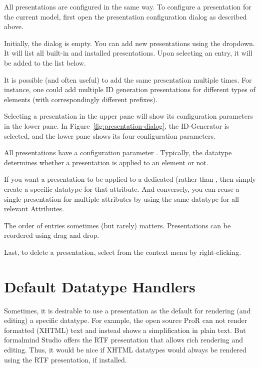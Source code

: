 All presentations are configured in the same way.  To configure a presentation for the current model, first open the presentation configuration dialog as described above.

Initially, the dialog is empty.  You can add new presentations using the  dropdown.  It will list all built-in and installed presentations.  Upon selecting an entry, it will be added to the list below.

\begin{info}It is possible (and often useful) to add the same presentation multiple times. For instance, one could add multiple ID generation presentations for different types of elements (with correspondingly different prefixes). 
\end{info}

Selecting a presentation in the upper pane will show its configuration parameters in the lower pane.  In Figure~\ref{fig:presentation-dialog}, the ID-Generator is selected, and the lower pane shows its four configuration parameters.

All presentations have a configuration parameter .  Typically, the datatype determines whether a presentation is applied to an element or not.

\begin{info}
  If you want a presentation to be applied to a dedicated  (rather than , then simply create a specific datatype for that attribute. And conversely, you can reuse a single presentation for multiple attributes by using the same datatype for all relevant Attributes.
\end{info}

The order of entries sometimes (but rarely) matters.  Presentations can be reordered using drag and drop.

Last, to delete a presentation, select  from the context menu by right-clicking.

\section{Default Datatype Handlers}

Sometimes, it is desirable to use a presentation as the default for rendering (and editing) a specific datatype.  For example, the open source ProR can not render formatted (XHTML) text and instead shows a simplification in plain text.  But formalmind Studio offers the RTF presentation that allows rich rendering and editing.  Thus, it would be nice if XHTML datatypes would always be rendered using the RTF presentation, if installed.


